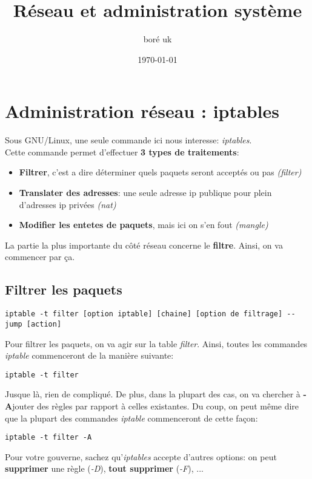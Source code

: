 \documentclass{article}
\title{Réseau et administration système}
\author{boré uk}
\date{\today}
\begin{document}
\maketitle{}

\section{Administration réseau : iptables}
Sous GNU/Linux, une seule commande ici nous interesse: \emph{iptables}.\\
Cette commande permet d'effectuer \textbf{3 types de traitements}:
\begin{itemize}
\item{\textbf{Filtrer}, c'est a dire déterminer quels paquets seront acceptés ou pas \emph{(filter)}}
\item{\textbf{Translater des adresses}: une seule adresse ip publique pour plein d'adresses ip privées \emph{(nat)}}
\item{\textbf{Modifier les entetes de paquets}, mais ici on s'en fout \emph{(mangle)}}
\end{itemize}

La partie la plus importante du côté réseau concerne le \textbf{filtre}. Ainsi, on va commencer par ça.

\subsection{Filtrer les paquets}
\begin{center}
\begin{verbatim}
iptable -t filter [option iptable] [chaine] [option de filtrage] --jump [action]
\end{verbatim}
\end{center}

Pour filtrer les paquets, on va agir sur la table \emph{filter}. Ainsi, toutes les commandes \emph{iptable} commenceront de la manière suivante:
\begin{verbatim}
iptable -t filter
\end{verbatim}
Jusque là, rien de compliqué. De plus, dans la plupart des cas, on va chercher à \textbf{-A}jouter des règles par rapport à celles existantes. Du coup, on peut même dire que la plupart des commandes \emph{iptable} commenceront de cette façon:
\begin{verbatim}
iptable -t filter -A
\end{verbatim}
Pour votre gouverne, sachez qu'\emph{iptables} accepte d'autres options: on peut \textbf{supprimer} une règle (\emph{-D}), \textbf{tout supprimer} (\emph{-F}), ...
\end{document}
